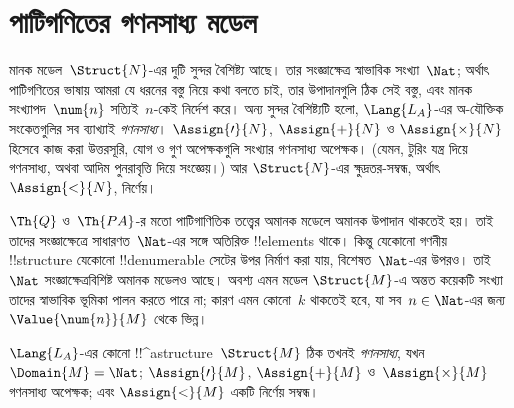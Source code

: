 \documentclass[../../../include/open-logic-section]{subfiles}
\begin{document}
\section{পাটিগণিতের গণনসাধ্য মডেল}

\begin{explain}
মানক মডেল~$\Struct{N}$-এর দুটি সুন্দর বৈশিষ্ট্য আছে। তার সংজ্ঞাক্ষেত্র
স্বাভাবিক সংখ্যা~$\Nat$; অর্থাৎ পাটিগণিতের ভাষায় আমরা যে ধরনের বস্তু
নিয়ে কথা বলতে চাই, তার উপাদানগুলি ঠিক সেই বস্তু, এবং মানক
সংখ্যাপদ~$\num{n}$ সত্যিই~$n$-কেই নির্দেশ করে। অন্য সুন্দর বৈশিষ্ট্যটি
হলো, $\Lang{L_A}$-এর অ-যৌক্তিক সংকেতগুলির সব ব্যাখ্যাই
\emph{গণনসাধ্য}। $\Assign{\prime}{N}$, $\Assign{+}{N}$ ও
$\Assign{\times}{N}$ হিসেবে কাজ করা উত্তরসূরি, যোগ ও গুণ অপেক্ষকগুলি
সংখ্যার গণনসাধ্য অপেক্ষক। (যেমন, টুরিং যন্ত্র দিয়ে গণনসাধ্য, অথবা
আদিম পুনরাবৃত্তি দিয়ে সংজ্ঞেয়।) আর $\Struct{N}$-এর ক্ষুদ্রতর-সম্বন্ধ,
অর্থাৎ $\Assign{<}{N}$, নির্ণেয়।

$\Th{Q}$ ও~$\Th{PA}$-র মতো পাটিগাণিতিক তত্ত্বের অমানক মডেলে অমানক
উপাদান থাকতেই হয়। তাই তাদের সংজ্ঞাক্ষেত্রে সাধারণত~$\Nat$-এর সঙ্গে
অতিরিক্ত !!{element}s থাকে। কিন্তু যেকোনো গণনীয় !!{structure} যেকোনো
!!{denumerable} সেটের উপর নির্মাণ করা যায়, বিশেষত~$\Nat$-এর উপরও।
তাই $\Nat$ সংজ্ঞাক্ষেত্রবিশিষ্ট অমানক মডেলও আছে। অবশ্য এমন মডেল
$\Struct{M}$-এ অন্তত কয়েকটি সংখ্যা তাদের স্বাভাবিক ভূমিকা পালন করতে
পারে না; কারণ এমন কোনো~$k$ থাকতেই হবে, যা সব~$n \in \Nat$-এর জন্য
$\Value{\num{n}}{M}$ থেকে ভিন্ন।
\end{explain}

\begin{defn}
$\Lang{L_A}$-এর কোনো !!^a{structure}~$\Struct{M}$ ঠিক তখনই
\emph{গণনসাধ্য}, যখন $\Domain{M}=\Nat$; $\Assign{\prime}{M}$,
$\Assign{+}{M}$ ও~$\Assign{\times}{M}$ গণনসাধ্য অপেক্ষক; এবং
$\Assign{<}{M}$ একটি নির্ণেয় সম্বন্ধ।
\end{defn}
\end{document}
